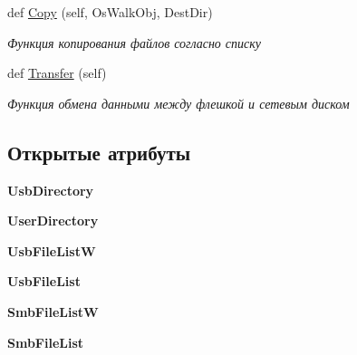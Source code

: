 \begin{DoxyCompactItemize}
def \mbox{\hyperlink{classisofc-service-2_1_1SambaConnect_a9f1fb626dc2e0d69254ffa2e79df8149}{Copy}} (self, Os\+Walk\+Obj, Dest\+Dir)
\begin{DoxyCompactList}\small\item\em Функция копирования файлов согласно списку \end{DoxyCompactList}\item 
\mbox{\label{classisofc-service-2_1_1SambaConnect_a0c1ff0b4585cf87c6e5746a1902f4bb6}} 
def \mbox{\hyperlink{classisofc-service-2_1_1SambaConnect_a0c1ff0b4585cf87c6e5746a1902f4bb6}{Transfer}} (self)
\begin{DoxyCompactList}\small\item\em Функция обмена данными между флешкой и сетевым диском \end{DoxyCompactList}\end{DoxyCompactItemize}
\subsection*{Открытые атрибуты}
\begin{DoxyCompactItemize}
\item 
\mbox{\label{classisofc-service-2_1_1SambaConnect_a7e63967a831d93e2ec16d9f8d4d85ec8}} 
{\bfseries Usb\+Directory}
\item 
\mbox{\label{classisofc-service-2_1_1SambaConnect_ae2830fc3a22f724f308c92dceb372e99}} 
{\bfseries User\+Directory}
\item 
\mbox{\label{classisofc-service-2_1_1SambaConnect_a0664dcc29213024feae06f5924b89d6c}} 
{\bfseries Usb\+File\+ListW}
\item 
\mbox{\label{classisofc-service-2_1_1SambaConnect_a53592a9c86102653d8ef2f6c364389fd}} 
{\bfseries Usb\+File\+List}
\item 
\mbox{\label{classisofc-service-2_1_1SambaConnect_a58db5b0680905662dbd8384ee549d26f}} 
{\bfseries Smb\+File\+ListW}
\item 
\mbox{\label{classisofc-service-2_1_1SambaConnect_a7fb0a782e4439a10cb8ce96184aba172}} 
{\bfseries Smb\+File\+List}
\end{DoxyCompactItemize}


